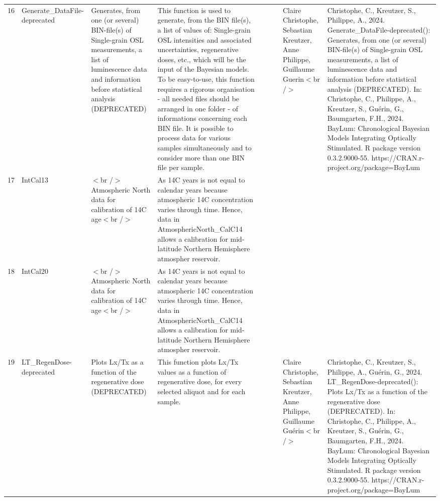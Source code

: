 \begin{table}[ht]
\begin{tabular}{rllllllll}
  16 & Generate\_DataFile-deprecated & Generates, from one (or several) BIN-file(s) of Single-grain OSL measurements, a list of luminescence data and information before statistical analysis (DEPRECATED) & This function is used to generate, from the BIN file(s), a list of values of: Single-grain  OSL intensities and associated uncertainties, regenerative doses, etc., which will be the input of the Bayesian models. To be easy-to-use, this function requires a rigorous organisation - all needed files should be arranged in one folder - of informations concerning each BIN file.   It is possible to process data for various samples simultaneously and to consider more than one BIN file per sample. &  &  &  & Claire Christophe, Sebastian Kreutzer, Anne Philippe, Guillaume Guerin$<$br /$>$ & Christophe, C., Kreutzer, S., Philippe, A., 2024. Generate\_DataFile-deprecated(): Generates, from one (or several) BIN-file(s) of Single-grain OSL measurements, a list of luminescence data and information before statistical analysis (DEPRECATED). In: Christophe, C., Philippe, A., Kreutzer, S., Guérin, G., Baumgarten, F.H., 2024. BayLum: Chronological Bayesian Models Integrating Optically Stimulated. R package version 0.3.2.9000-55. https://CRAN.r-project.org/package=BayLum
 \\ 
  17 & IntCal13 & $<$br /$>$ Atmospheric North data for calibration of 14C age$<$br /$>$ & As 14C years is not equal to calendar years because atmospheric 14C concentration varies through time. Hence, data in AtmosphericNorth\_CalC14 allows a calibration for mid-latitude Northern Hemisphere atmospher reservoir. &  &  &  &  &  \\ 
  18 & IntCal20 & $<$br /$>$ Atmospheric North data for calibration of 14C age$<$br /$>$ & As 14C years is not equal to calendar years because atmospheric 14C concentration varies through time. Hence, data in AtmosphericNorth\_CalC14 allows a calibration for mid-latitude Northern Hemisphere atmospher reservoir. &  &  &  &  &  \\ 
  19 & LT\_RegenDose-deprecated & Plots Lx/Tx as a function of the regenerative dose (DEPRECATED) & This function plots  Lx/Tx  values as a function of regenerative dose, for every selected aliquot and for each sample. &  &  &  & Claire Christophe, Sebastian Kreutzer, Anne Philippe, Guillaume Guérin$<$br /$>$ & Christophe, C., Kreutzer, S., Philippe, A., Guérin, G., 2024. LT\_RegenDose-deprecated(): Plots Lx/Tx as a function of the regenerative dose (DEPRECATED). In: Christophe, C., Philippe, A., Kreutzer, S., Guérin, G., Baumgarten, F.H., 2024. BayLum: Chronological Bayesian Models Integrating Optically Stimulated. R package version 0.3.2.9000-55. https://CRAN.r-project.org/package=BayLum

\end{tabular}
\end{table}
